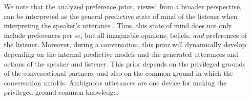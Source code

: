 \documentclass[10pt,a4paper]{article}
\begin{document}
We note that the analyzed preference prior, viewed from a broader perspective, can be interpreted as the general predictive state of mind of the listener when interpreting the speaker's utterance \cite{Butz:2017}. 
Thus, this state of mind does not only include preferences per se, but all imaginable opinions, beliefs, \emph{and} preferences of the listener. 
Moreover, during a conversation, this prior will dynamically develop depending on the internal predictive models and the generated utterances and actions of the speaker and listener. This prior depends on the privileged grounds of the conversational partners, and also on the common ground in which the conversation unfolds. Ambiguous utterances are one device for making the privileged ground common knowledge. 




\setlength{\bibleftmargin}{.125in}
\setlength{\bibindent}{-\bibleftmargin}


\end{document}

